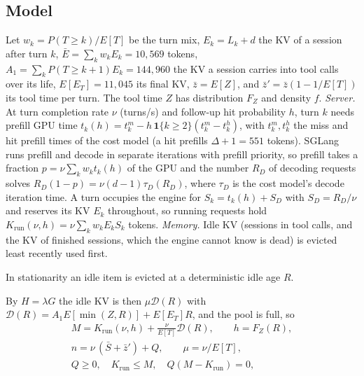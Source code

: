 \subsection{Model}\label{sec:fp-model}
Let $w_k=P(T\ge k)/E[T]$ be the turn mix, $E_k=L_k+d$ the KV of a session after turn $k$, $\bar E=\sum_k w_kE_k=10{,}569$ tokens, $A_1=\sum_k P(T\ge k+1)E_k=144{,}960$ the KV a session carries into tool calls over its life, $E[E_T]=11{,}045$ its final KV, $\bar z=E[Z]$, and $\bar z'=\bar z(1-1/E[T])$ its tool time per turn. The tool time $Z$ has distribution $F_Z$ and density $f$. \emph{Server.} At turn completion rate $\nu$ (turns/s) and follow-up hit probability $h$, turn $k$ needs prefill GPU time $t_k(h)=t^m_k-h\,\mathbf 1\{k\ge2\}(t^m_k-t^h_k)$, with $t^m_k,t^h_k$ the miss and hit prefill times of the cost model (a hit prefills $\Delta+1=551$ tokens). SGLang runs prefill and decode in separate iterations with prefill priority, so prefill takes a fraction $p=\nu\sum_kw_kt_k(h)$ of the GPU and the number $R_D$ of decoding requests solves $R_D(1-p)=\nu(d-1)\tau_D(R_D)$, where $\tau_D$ is the cost model's decode iteration time. A turn occupies the engine for $S_k=t_k(h)+S_D$ with $S_D=R_D/\nu$ and reserves its KV $E_k$ throughout, so running requests hold $K_{\mathrm{run}}(\nu,h)=\nu\sum_kw_kE_kS_k$ tokens. \emph{Memory.} Idle KV (sessions in tool calls, and the KV of finished sessions, which the engine cannot know is dead) is evicted least recently used first.
\begin{assumption}
In stationarity an idle item is evicted at a deterministic idle age $R$.
\end{assumption}
\noindent By $H=\lambda G$ the idle KV is then $\mu\mathcal D(R)$ with $\mathcal D(R)=A_1E[\min(Z,R)]+E[E_T]R$, and the pool is full, so
\begin{equation}\label{eq:balance}
\begin{gathered}
M=K_{\mathrm{run}}(\nu,h)+\frac{\nu}{E[T]}\mathcal D(R),\qquad h=F_Z(R),\\
n=\nu\,(\bar S+\bar z')+Q,\qquad \mu=\nu/E[T],\\
Q\ge0,\quad K_{\mathrm{run}}\le M,\quad Q(M-K_{\mathrm{run}})=0,
\end{gathered}
\end{equation}
